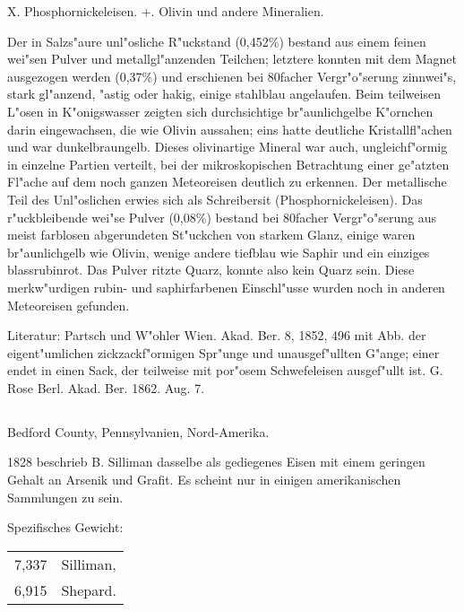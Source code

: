 \documentclass[a4paper, 11pt, oneside]{article}
\begin{document}
X. Phosphornickeleisen.  
+. Olivin und andere Mineralien.

Der in Salzs"aure unl"osliche R"uckstand (0,452\%) bestand aus einem feinen wei"sen Pulver und metallgl"anzenden Teilchen; letztere konnten mit dem Magnet ausgezogen werden (0,37\%) und erschienen bei 80facher Vergr"o"serung zinnwei"s, stark gl"anzend, "astig oder hakig, einige stahlblau angelaufen. Beim teilweisen L"osen in K"onigswasser zeigten sich durchsichtige br"aunlichgelbe K"ornchen darin eingewachsen, die wie Olivin aussahen; eins hatte deutliche Kristallfl"achen und war dunkelbraungelb. Dieses olivinartige Mineral war auch, ungleichf"ormig in einzelne Partien verteilt, bei der mikroskopischen Betrachtung einer ge"atzten Fl"ache auf dem noch ganzen Meteoreisen deutlich zu erkennen. Der metallische Teil des Unl"oslichen erwies sich als Schreibersit (Phosphornickeleisen). Das r"uckbleibende wei"se Pulver (0,08\%) bestand bei 80facher Vergr"o"serung aus meist farblosen abgerundeten St"uckchen von starkem Glanz, einige waren br"aunlichgelb wie Olivin, wenige andere tiefblau wie Saphir und ein einziges blassrubinrot. Das Pulver ritzte Quarz, konnte also kein Quarz sein. Diese merkw"urdigen rubin- und saphirfarbenen Einschl"usse wurden noch in anderen Meteoreisen gefunden.

\normalsize
Literatur: Partsch und W"ohler Wien. Akad. Ber. 8, 1852, 496 mit Abb. der eigent"umlichen zickzackf"ormigen Spr"unge und unausgef"ullten G"ange; einer endet in einen Sack, der teilweise mit por"osem Schwefeleisen ausgef"ullt ist. G. Rose Berl. Akad. Ber. 1862. Aug. 7.

\subsection{}
\LARGE
\paragraph{}
Bedford County, Pennsylvanien, Nord-Amerika.

1828 beschrieb B. Silliman dasselbe als gediegenes Eisen mit einem geringen Gehalt an Arsenik und Grafit. Es scheint nur in einigen amerikanischen Sammlungen zu sein.

Spezifisches Gewicht:  
\begin{table}[!ht]
    \centering\swabfamily\Large
    \begin{tabular}{l l}
        7,337 & Silliman,\\
        6,915 & Shepard.
    \end{tabular}
\end{table}
\end{document}
